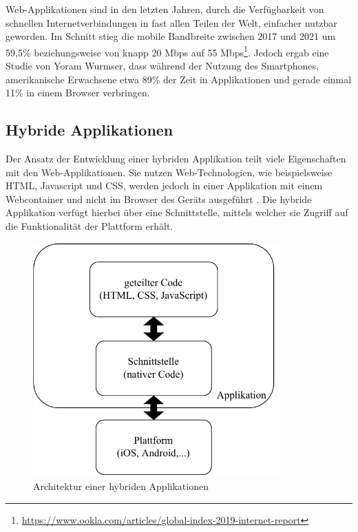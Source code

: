 Web-Applikationen sind in den letzten Jahren, durch die Verfügbarkeit von schnellen Internetverbindungen in fast allen Teilen der Welt, einfacher nutzbar geworden.
Im Schnitt stieg die mobile Bandbreite zwischen 2017 und 2021 um 59,5\% beziehungsweise von knapp 20 Mbps auf 55 Mbps\footnote{\url{https://www.ookla.com/articles/global-index-2019-internet-report}}.
Jedoch ergab eine Studie\cite{report_webusage} von Yoram Wurmser, dass während der Nutzung des Smartphones, amerikanische Erwachsene etwa 89\% der Zeit in Applikationen und gerade einmal 11\% in einem Browser verbringen.

\subsection{Hybride Applikationen}
\label{cha:3_hybrid}
Der Ansatz der Entwicklung einer hybriden Applikation teilt viele Eigenschaften mit den Web-Applikationen.
Sie nutzen Web-Technologien, wie beispielsweise HTML, Javascript und CSS, werden jedoch in einer Applikation mit einem Webcontainer und nicht im Browser des Geräts ausgeführt \cite{IEEE_development_classes}.
Die hybride Applikation verfügt hierbei über eine Schnittstelle, mittels welcher sie Zugriff auf die Funktionalität der Plattform erhält.

\begin{figure}[ht]
  \centering
  \includegraphics[height=9cm,keepaspectratio]{images/hybrid_architecture.drawio.pdf} 
  \caption{Architektur einer hybriden Applikationen}
  \label{fig:hybrid_architecture}
\end{figure}

